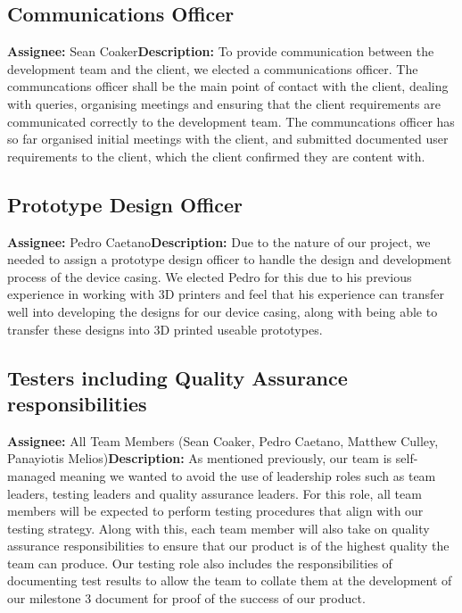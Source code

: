         \subsection{Communications Officer} \textbf{Assignee: } Sean Coaker\newline \textbf{Description: } To provide
        communication between the development team and the client, we elected a communications officer. The
        communcations officer shall be the main point of contact with the client, dealing with queries, organising
        meetings and ensuring that the client requirements are communicated correctly to the development team. The
        communcations officer has so far organised initial meetings with the client, and submitted documented user
        requirements to the client, which the client confirmed they are content with.

        \subsection{Prototype Design Officer} \textbf{Assignee: } Pedro Caetano\newline \textbf{Description: } Due to
        the nature of our project, we needed to assign a prototype design officer to handle the design and development
        process of the device casing. We elected Pedro for this due to his previous experience in working with 3D
        printers and feel that his experience can transfer well into developing the designs for our device casing, along
        with being able to transfer these designs into 3D printed useable prototypes.

        \subsection{Testers including Quality Assurance responsibilities} \textbf{Assignee: } All Team Members (Sean Coaker, Pedro Caetano, Matthew Culley, Panayiotis Melios)\newline \textbf{Description: } As mentioned previously, our team is self-managed meaning we wanted to avoid the use of leadership roles such as team leaders, testing leaders and quality assurance leaders. For this role, all team members will be expected to perform testing procedures that align with our testing strategy. Along with this, each team member will also take on quality assurance responsibilities to ensure that our product is of the highest quality the team can produce. Our testing role also includes the responsibilities of documenting test results to allow the team to collate them at the development of our milestone 3 document for proof of the success of our product.

